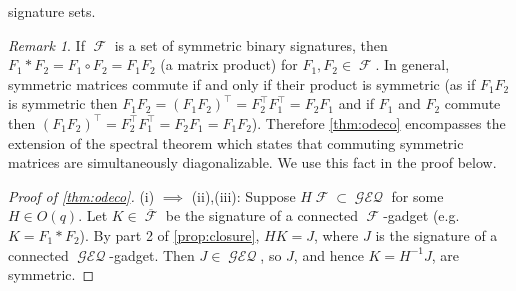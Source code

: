 \documentclass{article}
\theoremstyle{remark}
\newtheorem{remark}{Remark}[section]
\theoremstyle{definition}
\DeclareMathOperator{\fc}{\mathcal{F}}
\DeclareMathOperator{\geneq}{\mathcal{GEQ}}
\begin{document}
signature sets.
\begin{remark}
    If $\fc$ is a set of symmetric binary signatures, then $F_1 * F_2 = F_1 \circ F_2 = F_1F_2$
    (a matrix product) for $F_1,F_2 \in \fc$. In general, symmetric matrices commute if and only
    if their product is symmetric (as if $F_1F_2$ is symmetric then $F_1F_2 = (F_1F_2)^\top = F_2^\top
    F_1^\top = F_2F_1$ and if $F_1$ and $F_2$ commute then $(F_1F_2)^\top = F_2^\top F_1^\top = F_2F_1 = F_1F_2$).
    Therefore \autoref{thm:odeco} encompasses the extension of the spectral theorem
    which states that commuting symmetric matrices are simultaneously diagonalizable. We use this
    fact in the proof below.
    \label{rem:spectral}
\end{remark}
\begin{proof}[Proof of \autoref{thm:odeco}]
    (i) $\implies$ (ii),(iii): Suppose $H \fc \subset \geneq$ for some $H \in O(q)$.
    Let $K \in \overline{\fc}$ be the signature of a connected $\fc$-gadget (e.g. $K = F_1 * F_2$).
    By part 2 of \autoref{prop:closure}, $HK = J$, where $J$ is the signature of a connected 
    $\geneq$-gadget. Then $J \in \geneq$, so $J$, and hence $K = H^{-1}J$, are symmetric.


\end{proof}
\end{document}
